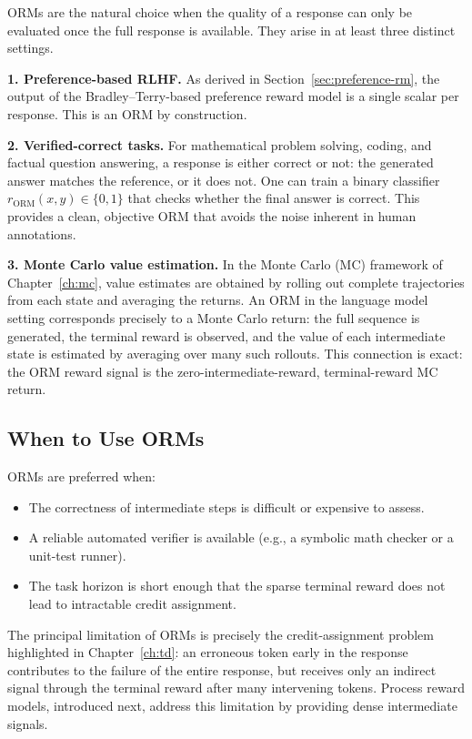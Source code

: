 ORMs are the natural choice when the quality of a response can only be evaluated once the full response is available. They arise in at least three distinct settings.

\textbf{1. Preference-based RLHF.} As derived in Section~\ref{sec:preference-rm}, the output of the Bradley--Terry-based preference reward model is a single scalar per response. This is an ORM by construction.

\textbf{2. Verified-correct tasks.} For mathematical problem solving, coding, and factual question answering, a response is either correct or not: the generated answer matches the reference, or it does not. One can train a binary classifier $r_{\mathrm{ORM}}(x, y) \in \{0, 1\}$ that checks whether the final answer is correct. This provides a clean, objective ORM that avoids the noise inherent in human annotations.

\textbf{3. Monte Carlo value estimation.} In the Monte Carlo (MC) framework of Chapter~\ref{ch:mc}, value estimates are obtained by rolling out complete trajectories from each state and averaging the returns. An ORM in the language model setting corresponds precisely to a Monte Carlo return: the full sequence is generated, the terminal reward is observed, and the value of each intermediate state is estimated by averaging over many such rollouts. This connection is exact: the ORM reward signal is the zero-intermediate-reward, terminal-reward MC return.

\subsection{When to Use ORMs}

ORMs are preferred when:
\begin{itemize}[leftmargin=*]
  \item The correctness of intermediate steps is difficult or expensive to assess.
  \item A reliable automated verifier is available (e.g., a symbolic math checker or a unit-test runner).
  \item The task horizon is short enough that the sparse terminal reward does not lead to intractable credit assignment.
\end{itemize}

The principal limitation of ORMs is precisely the credit-assignment problem highlighted in Chapter~\ref{ch:td}: an erroneous token early in the response contributes to the failure of the entire response, but receives only an indirect signal through the terminal reward after many intervening tokens. Process reward models, introduced next, address this limitation by providing dense intermediate signals.

